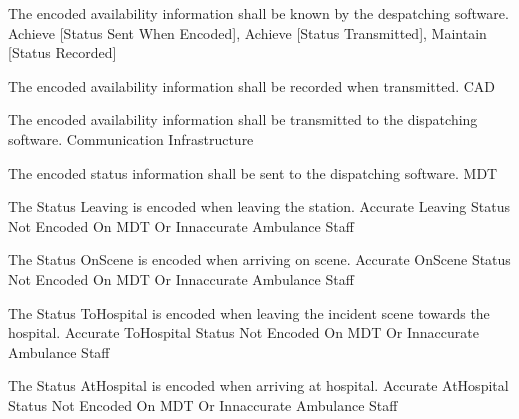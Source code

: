   \startkaosspec
  	 {The encoded availability information shall be known by the despatching software.}
  	 {Achieve [Status Sent When Encoded], Achieve [Status Transmitted], Maintain [Status Recorded]}
  \stopkaosspec

  \startkaosspec
  	 {The encoded availability information shall be recorded when transmitted.}
  	 {CAD}
  \stopkaosspec

  \startkaosspec
  	 {The encoded availability information shall be transmitted to the dispatching software.}
  	 {Communication Infrastructure}
  \stopkaosspec

  \startkaosspec
  	 {The encoded status information shall be sent to the dispatching software.}
  	 {MDT}
  \stopkaosspec
  
  
    {}

  \startkaosspec
  	 {The Status Leaving is encoded when leaving the station.}
  	 {Accurate Leaving Status Not Encoded On MDT Or Innaccurate}
  	 {Ambulance Staff}
  \stopkaosspec

  \startkaosspec
  	 {The Status OnScene is encoded when arriving on scene.}
  	 {Accurate OnScene Status Not Encoded On MDT Or Innaccurate}
  	 {Ambulance Staff}
  \stopkaosspec

  \startkaosspec
  	 {The Status ToHospital is encoded when leaving the incident scene towards the hospital.}
  	 {Accurate ToHospital Status Not Encoded On MDT Or Innaccurate}
  	 {Ambulance Staff}
  \stopkaosspec

  \startkaosspec
  	 {The Status AtHospital is encoded when arriving at hospital.}
  	 {Accurate AtHospital Status Not Encoded On MDT Or Innaccurate}
  	 {Ambulance Staff}
  \stopkaosspec

